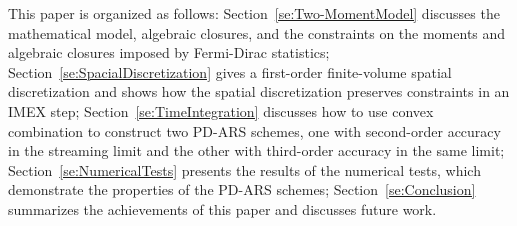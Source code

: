 This paper is organized as follows: Section~\ref{se:Two-MomentModel} discusses the mathematical model, algebraic closures, and the constraints on the moments and algebraic closures imposed by Fermi-Dirac statistics;
Section~\ref{se:SpacialDiscretization} gives a first-order finite-volume spatial discretization and shows how the spatial discretization preserves constraints in an IMEX step;
Section~\ref{se:TimeIntegration} discusses how to use convex combination to construct two PD-ARS schemes, one with second-order accuracy in the streaming limit and the other with third-order accuracy in the same limit;
Section~\ref{se:NumericalTests} presents the results of the numerical tests, which demonstrate the properties of the PD-ARS schemes; Section~\ref{se:Conclusion} summarizes the achievements of this paper and discusses future work.

